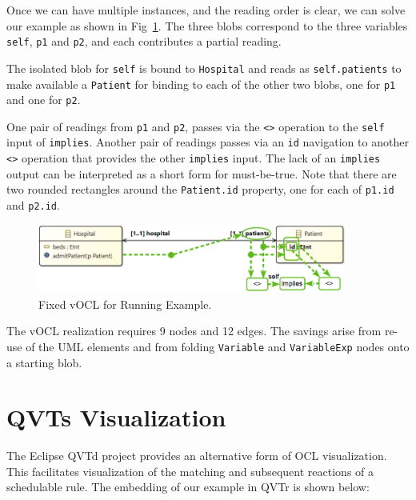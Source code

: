 \documentclass{llncs}
\begin{document}
Once we can have multiple instances, and the reading order is clear, we can solve our example as shown in Fig~\ref{fig:vOCLinv}. The three blobs correspond to the three variables \verb$self$, \verb$p1$ and \verb$p2$, and each contributes a partial reading.

The isolated blob for \verb$self$ is bound to \verb$Hospital$ and reads as \verb$self.patients$ to make available a \verb$Patient$ for binding to each of the other two blobs, one for \verb$p1$ and one for \verb$p2$.

One pair of readings from \verb$p1$ and \verb$p2$, passes via the \verb$<>$ operation to the \verb$self$ input of \verb$implies$. Another pair of readings passes via an \verb$id$ navigation to another \verb$<>$ operation that provides the other \verb$implies$ input. The lack of an \verb$implies$ output can be interpreted as a short form for must-be-true. Note that there are two rounded rectangles around the \verb$Patient.id$ property, one for each of \verb$p1.id$ and \verb$p2.id$.

\begin{figure}
	\vspace{-10pt}
	\begin{center}
		\includegraphics[width=4.0in]{vOCLinv.png}
	\end{center}
	\vspace{-10pt}
	\vspace{-10pt}
	\caption{Fixed vOCL for Running Example.}
	\label{fig:vOCLinv}
	\vspace{-10pt}
\end{figure}

The vOCL realization requires 9 nodes and 12 edges. The savings arise from re-use of the UML elements and from folding \verb$Variable$ and \verb$VariableExp$ nodes onto a starting blob.

\section{QVTs Visualization}\label{QVTs}

The Eclipse QVTd project provides an alternative form of OCL visualization. This facilitates visualization of the matching and subsequent reactions of a schedulable rule. The embedding of our example in QVTr is shown below:
\end{document}
